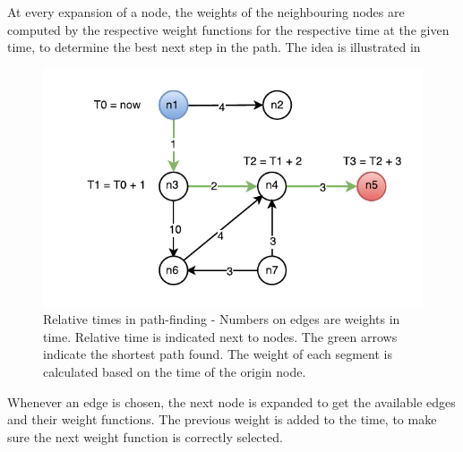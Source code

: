At every expansion of a node, the weights of the neighbouring nodes are computed by the respective weight functions for the respective time at the given time, to determine the best next step in the path. The idea is illustrated in 
\begin{figure}[h]
\centering
\includegraphics[width=\linewidth]{figures/timed-graph}
\caption{Relative times in path-finding - Numbers on edges are weights in time. Relative time is indicated next to nodes. The green arrows indicate the shortest path found. The weight of each segment is calculated based on the time of the origin node.}
\label{fig:timed-graph}
\end{figure}

Whenever an edge is chosen, the next node is expanded to get the available edges and their weight functions. The previous weight is added to the time, to make sure the next weight function is correctly selected.





